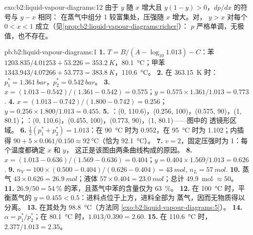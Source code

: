 \begin{solution}{exo:b2:liquid-vapour-diagrams:12}
由于 $y$ 随 $x$ 增大且 $y(1 - y) > 0$，$dp/dx$ 的符号与 $y - x$ 相同：
在蒸气中组分 1 较富集处，压强随 $x$ 增大。对，
$y > x$ 对每个 $0 < x < 1$ 成立（见\cref{prop:b2:liquid-vapour-diagrams:richer}）：
$p$ 严格单调，无极值，也不存在。
\end{solution}

\begin{solution}{pb:b2:liquid-vapour-diagrams:1}
\textbf{1.} $T = B/(A - \log_{10}1.013) - C$：苯 $1203.835/4.01253 + 53.226 =
\qty{353.2}{K}$，\qty{80.1}{\degreeCelsius}；甲苯 $1343.943/4.07266 + 53.773 =
\qty{383.8}{K}$，\qty{110.6}{\degreeCelsius}。
\textbf{2.} 在 \qty{363.15}{K} 时：$p_1^* = \qty{1.361}{bar}$，$p_2^* = \qty{0.542}{bar}$。
\textbf{3.} $x = (1.013 - 0.542)/(1.361 - 0.542) = 0.575$；$y = 0.575 \times
1.361/1.013 = 0.773$.
\textbf{4.} $x = (1.013 - 0.742)/(1.800 - 0.742) = 0.256$；$y = 0.256 \times
1.800/1.013 = 0.455$.
\textbf{5.} ：(0, 110.6)，(0.256, 100)，(0.575, 90)，(1, 80.1)；：(0, 110.6)，(0.455, 100)，(0.773, 90)，(1, 80.1)——图中的
透镜形区域。
\textbf{6.} $\frac12(p_1^* + p_2^*) = 1.013$：在 \qty{90}{\degreeCelsius} 时为 0.952，在
\qty{95}{\degreeCelsius} 时为 1.102；内插得 $90 + 5 \times 0.061/0.150 \approx
\qty{92}{\degreeCelsius}$（恰为 \qty{92.1}{\degreeCelsius}）。
\textbf{7.} $v = 2$，固定压强时为 1：每个温度都确定 $x$ 和 $y$，
这正是该图由两条曲线构成的原因。
\textbf{8.} $x = (1.013 - 0.636)/(1.569 - 0.636) = 0.404$；$y = 0.404 \times
1.569/1.013 = 0.626$.
\textbf{9.} $n_V = 100 \times (0.500 - 0.404)/(0.626 - 0.404) = \qty{43}{mol}$,
$n_L = \qty{57}{mol}$.
\textbf{10.} 蒸气 $43 \times 0.626 = \qty{26.9}{mol}$；液体 $57 \times 0.404
= \qty{23.0}{mol}$；总计 \qty{49.9}{mol} $\approx 50$。
\textbf{11.} $26.9/50 = 54~\%$ 的苯，且蒸气中苯的含量仅为 63~\%。
\textbf{12.} 在 \qty{100}{\degreeCelsius} 时，平衡蒸气的 $y =
0.455 < 0.5$：进料点位于上方，进料全部为
蒸气，因而无物质得以分离。
\textbf{13.} 在其处为 \qty{98.8}{\degreeCelsius}（方法同
\cref{exo:b2:liquid-vapour-diagrams:5}）。
\textbf{14.} $\alpha = p_1^*/p_2^*$；在 \qty{80.1}{\degreeCelsius} 时，$1.013/0.390 =
2.60$.
\textbf{15.} 在 \qty{110.6}{\degreeCelsius} 时，$2.377/1.013 = 2.35$。

\end{solution}
